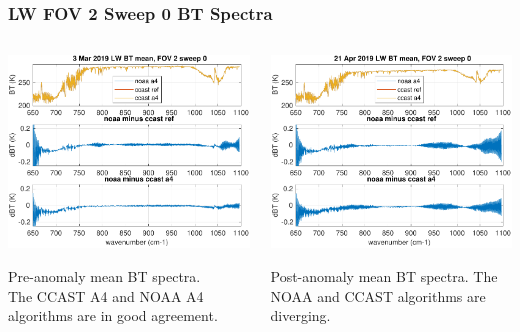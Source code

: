 \documentclass[10pt]{beamer}
\begin{document}
\begin{frame}
\frametitle{LW FOV 2 Sweep 0 BT Spectra}
\begin{columns}[t]
\begin{column}{0.5\textwidth}
  \begin{centering}
  \includegraphics[width=\textwidth]{figures/LW_MW_good_BT_fov2_sd0.pdf}
  \end{centering}\vspace{3mm}
  Pre-anomaly mean BT spectra.  \\The CCAST A4 and NOAA A4 algorithms
  are in good agreement.

\end{column}
\begin{column}{0.5\textwidth}  
  \begin{centering}
  \includegraphics[width=\textwidth]{figures/LW_MW_fail_BT_fov2_sd0.pdf}
  \end{centering}\vspace{3mm}
  Post-anomaly mean BT spectra.  The NOAA and CCAST algorithms are
  diverging.

\end{column}
\end{columns}

\end{frame}
\end{document}
